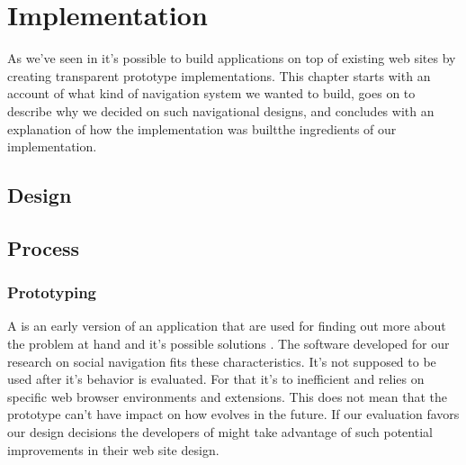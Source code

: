 \chapter{Implementation}
\label{chapter:implementation}


As we've seen in 
it's possible to build applications on top of existing web sites by creating
transparent prototype implementations. This chapter starts with an account of
what kind of navigation system we wanted to build, goes on to describe why we
decided on such navigational designs, and concludes with an explanation of how
the implementation was built\dash{}the ingredients of our implementation.

\section{Design}

%

\section{Process}

\subsection{Prototyping}

A  is an early version of an application that are used for
finding out more about the problem at hand and it's possible solutions
\citep[p.~409]{sommerville07}.
The software developed for our research on social navigation fits these
characteristics. It's not supposed to be used after it's behavior is
evaluated. For that it's to inefficient and relies on specific web browser
environments and extensions. This does not mean that the prototype can't have
impact on how \urort{} evolves in the future. If our evaluation favors our
design decisions the developers of \urort{} might take advantage of such
potential improvements in their web site design.


